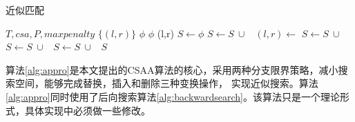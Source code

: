 \begin{algorithm}[H]
    \caption{近似匹配}
    \label{alg:appro}
    \begin{algorithmic}[1]
        \Require $T,csa,P,maxpenalty$
        \Ensure $\{(l,r)\}$
                \State \Return $\phi$
            \EndIf
                \State \Return $\phi$
            \EndIf
                \State \Return (l,r)
            \EndIf
            \State $S \gets \phi$
            \State $S \gets S\ \cup$\ 
                \State $(l,r)\gets$
                \State $S \gets S\ \cup\ $ 
                    \State $S \gets S\ \cup$\ 
                    \Else
                    \State $S \gets S\ \cup$\ 
                    \EndIf
                \EndIf
            \EndFor
            \State \Return $S$
        \EndFunction
    \end{algorithmic}
\end{algorithm}

算法\ref{alg:appro}是本文提出的CSAA算法的核心，采用两种分支限界策略，减小搜索空间，能够完成替换，插入和删除三种变换操作，
实现近似搜索。算法\ref{alg:appro}同时使用了后向搜索算法\ref{alg:backwardsearch}。该算法只是一个理论形式，具体实现中必须做一些修改。


